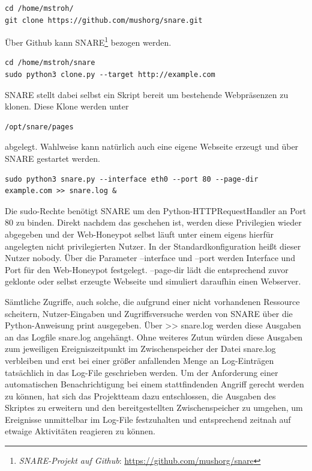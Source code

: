 \begin{lstlisting}[style=customc]
cd /home/mstroh/
git clone https://github.com/mushorg/snare.git
\end{lstlisting}

Über Github kann SNARE\footnote{ \textit{SNARE-Projekt auf Github}: \url{https://github.com/mushorg/snare}} bezogen werden.

\begin{lstlisting}[style=customc]
cd /home/mstroh/snare
sudo python3 clone.py --target http://example.com
\end{lstlisting}

SNARE stellt dabei selbst ein Skript bereit um bestehende Webpräsenzen zu klonen. Diese Klone werden unter
\begin{lstlisting}[style=customc]
/opt/snare/pages
\end{lstlisting}
abgelegt. Wahlweise kann natürlich auch eine eigene Webseite erzeugt und über SNARE gestartet werden.

\begin{lstlisting}[style=customc]
sudo python3 snare.py --interface eth0 --port 80 --page-dir example.com >> snare.log &
\end{lstlisting}
Die sudo-Rechte benötigt SNARE um den Python-HTTPRequestHandler an Port 80 zu binden. Direkt nachdem das geschehen ist, werden diese Privilegien wieder abgegeben und der Web-Honeypot selbst läuft unter einem eigens hierfür angelegten nicht privilegierten Nutzer. In der Standardkonfiguration heißt dieser Nutzer nobody. Über die Parameter \grqq{}--interface\grqq{} und \grqq{}--port\grqq{} werden Interface und Port für den Web-Honeypot festgelegt. \grqq{}--page-dir\grqq{} lädt die entsprechend zuvor geklonte oder selbst erzeugte Webseite und simuliert daraufhin einen Webserver. 

Sämtliche Zugriffe, auch solche, die aufgrund einer nicht vorhandenen Ressource scheitern, Nutzer-Eingaben und Zugriffsversuche werden von SNARE über die Python-Anweisung print ausgegeben. Über \grqq{}>> snare.log\grqq{} werden diese Ausgaben an das Logfile \grqq{}snare.log\grqq{} angehängt.  Ohne weiteres Zutun würden diese Ausgaben zum jeweiligen Ereigniszeitpunkt im Zwischenspeicher der Datei \grqq{}snare.log\grqq{} verbleiben und erst bei einer größer anfallenden Menge an Log-Einträgen tatsächlich in das Log-File geschrieben werden. Um der Anforderung einer automatischen Benachrichtigung bei einem stattfindenden Angriff gerecht werden zu können, hat sich das Projektteam dazu entschlossen, die Ausgaben des Skriptes zu erweitern und den bereitgestellten Zwischenspeicher zu umgehen, um Ereignisse unmittelbar im Log-File festzuhalten und entsprechend zeitnah auf etwaige Aktivitäten reagieren zu können. 

